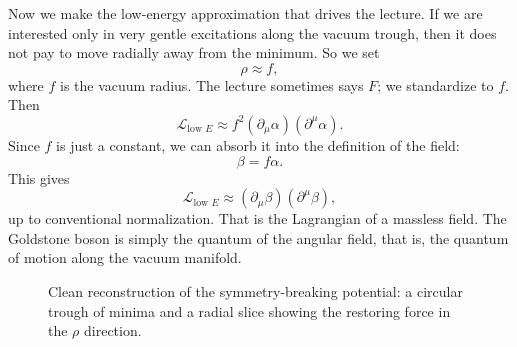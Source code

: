 Now we make the low-energy approximation that drives the lecture. If we are interested only in very gentle excitations along the vacuum trough, then it does not pay to move radially away from the minimum. So we set
\[
\rho \approx f,
\]
where \(f\) is the vacuum radius. The lecture sometimes says \(F\); we standardize to \(f\). Then
\begin{equation}
\mathcal{L}_{\text{low }E}\approx f^2(\partial_\mu\alpha)(\partial^\mu\alpha).
\label{eq:low-energy-alpha-refined}
\end{equation}
Since \(f\) is just a constant, we can absorb it into the definition of the field:
\begin{equation}
\beta=f\alpha.
\label{eq:beta-definition-refined}
\end{equation}
This gives
\begin{equation}
\mathcal{L}_{\text{low }E}\approx (\partial_\mu\beta)(\partial^\mu\beta),
\label{eq:beta-massless-refined}
\end{equation}
up to conventional normalization. That is the Lagrangian of a massless field. The Goldstone boson is simply the quantum of the angular field, that is, the quantum of motion along the vacuum manifold.

\begin{figure}[t]
\centering
{}
\caption{Clean reconstruction of the symmetry-breaking potential: a circular trough of minima and a radial slice showing the restoring force in the \(\rho\) direction.}
\label{fig:lecture07-mexican-hat-refined}
\end{figure}

